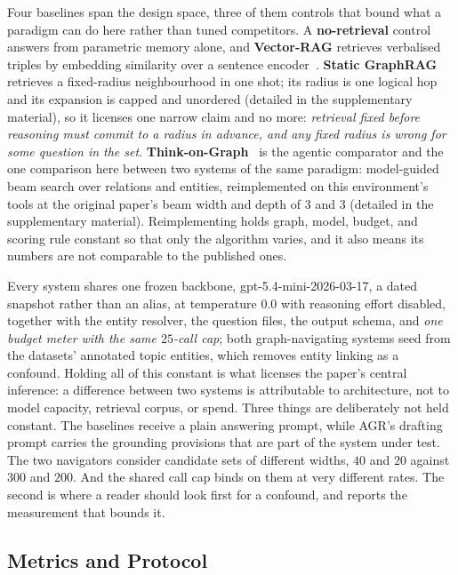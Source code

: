 Four baselines span the design space, three of them controls that bound
what a paradigm can do here rather than tuned competitors. A
\textbf{no-retrieval} control answers from parametric memory alone, and
\textbf{Vector-RAG} retrieves verbalised triples by embedding similarity
over a sentence encoder~\cite{reimers2019sentence}. \textbf{Static
GraphRAG}~\cite{edge2024local} retrieves a fixed-radius neighbourhood in
one shot; its radius is one logical hop and its expansion is capped and
unordered (detailed in the supplementary material), so it licenses one
narrow claim and no more: \emph{retrieval fixed before reasoning must
commit to a radius in advance, and any fixed radius is wrong for some
question in the set}. \textbf{Think-on-Graph}~\cite{sun2024think} is the
agentic comparator and the one comparison here between two systems of
the same paradigm: model-guided beam search over relations and entities,
reimplemented on this environment's tools at the original paper's beam
width and depth of $3$ and $3$ (detailed in the supplementary material).
Reimplementing holds graph, model, budget, and scoring rule constant so
that only the algorithm varies, and it also means its numbers are not
comparable to the published ones.

Every system shares one frozen backbone,
\textsf{gpt-5.4-mini-2026-03-17}, a dated snapshot rather than an alias,
at temperature $0.0$ with reasoning effort disabled, together with the
entity resolver, the question files, the output schema, and \emph{one
budget meter with the same $25$-call cap}; both graph-navigating systems
seed from the datasets' annotated topic entities, which removes entity
linking as a confound. Holding all of this constant is what licenses the
paper's central inference: a difference between two systems is
attributable to architecture, not to model capacity, retrieval corpus,
or spend. Three things are deliberately not held constant. The baselines
receive a plain answering prompt, while AGR's drafting prompt carries
the grounding provisions that are part of the system under test. The two
navigators consider candidate sets of different widths, $40$ and $20$
against $300$ and $200$. And the shared call cap binds on them at very
different rates. The second is where a reader should look first for a
confound, and  reports the measurement that bounds it.

\subsection{Metrics and Protocol}\label{sec:protocol}

